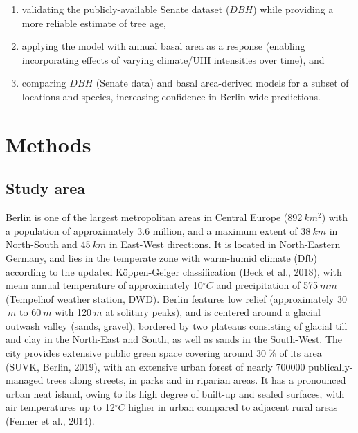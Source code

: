 \documentclass[
]{article}
\providecommand{\tightlist}{%
  \setlength{\itemsep}{0pt}\setlength{\parskip}{0pt}}
\begin{document}
\begin{enumerate}
\def\labelenumi{\arabic{enumi})}
\tightlist
\item
  validating the publicly-available Senate dataset (\(DBH\)) while providing a more reliable estimate of tree age,\\
\item
  applying the model with annual basal area as a response (enabling incorporating effects of varying climate/UHI intensities over time), and\\
\item
  comparing \(DBH\) (Senate data) and basal area-derived models for a subset of locations and species, increasing confidence in Berlin-wide predictions.
\end{enumerate}

\hypertarget{sec:methods}{%
\section{Methods}\label{sec:methods}}

\hypertarget{study-area}{%
\subsection{Study area}\label{study-area}}

Berlin is one of the largest metropolitan areas in Central Europe (892\(~km^2\)) with a population of approximately 3.6 million, and a maximum extent of 38\(~km\) in North-South and 45\(~km\) in East-West directions.
It is located in North-Eastern Germany, and lies in the temperate zone with warm-humid climate (Dfb) according to the updated Köppen-Geiger classification (Beck et al., 2018), with mean annual temperature of approximately 10\(^\circ C\) and precipitation of 575\(~mm\) (Tempelhof weather station, DWD).
Berlin features low relief (approximately 30\(~m\) to 60\(~m\) with 120\(~m\) at solitary peaks), and is centered around a glacial outwash valley (sands, gravel), bordered by two plateaus consisting of glacial till and clay in the North-East and South, as well as sands in the South-West.
The city provides extensive public green space covering around 30\(~\%\) of its area (SUVK, Berlin, 2019), with an extensive urban forest of nearly 700000 publically-managed trees along streets, in parks and in riparian areas.
It has a pronounced urban heat island, owing to its high degree of built-up and sealed surfaces, with air temperatures up to 12\(^\circ C\) higher in urban compared to adjacent rural areas (Fenner et al., 2014).
\end{document}

